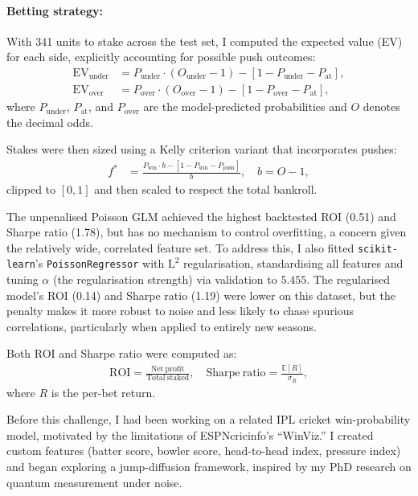\documentclass[12pt]{article}
\begin{document}
\paragraph{Betting strategy:}  
With 341 units to stake across the test set, I computed the expected value (EV) for each side, explicitly accounting for possible push outcomes:
\begin{align*}
\mathrm{EV}_\text{under} &= P_\text{under} \cdot (O_\text{under} - 1) - \left[1 - P_\text{under} - P_\text{at}\right], \\
\mathrm{EV}_\text{over}  &= P_\text{over} \cdot (O_\text{over} - 1) - \left[1 - P_\text{over} - P_\text{at}\right],
\end{align*}
where $P_\text{under}$, $P_\text{at}$, and $P_\text{over}$ are the model-predicted probabilities and $O$ denotes the decimal odds.

Stakes were then sized using a Kelly criterion variant that incorporates pushes:
\begin{align*}
f^* &= \frac{P_\text{win} \cdot b - \left[1 - P_\text{win} - P_\text{push}\right]}{b},
\quad b = O - 1,
\end{align*}
clipped to $[0,1]$ and then scaled to respect the total bankroll.

The unpenalised Poisson GLM achieved the highest backtested ROI (0.51) and Sharpe ratio (1.78), but has no mechanism to control overfitting, a concern given the relatively wide, correlated feature set.
To address this, I also fitted \texttt{scikit-learn}’s \texttt{PoissonRegressor} with $\mathrm{L}^2$ regularisation, standardising all features and tuning $\alpha$ (the regularisation strength) via validation to $5.455$.
The regularised model’s ROI (0.14) and Sharpe ratio (1.19) were lower on this dataset, but the penalty makes it more robust to noise and less likely to chase spurious correlations, particularly when applied to entirely new seasons.

Both ROI and Sharpe ratio were computed as:
\begin{eqnarray}
\mathrm{ROI} = \frac{\mathrm{Net\ profit}}{\mathrm{Total\ staked}},
\quad
\mathrm{Sharpe\ ratio} = \frac{\mathbb{E}[R]}{\sigma_R},
\end{eqnarray}
where $R$ is the per-bet return.



Before this challenge, I had been working on a related IPL cricket win-probability model, motivated by the limitations of ESPNcricinfo’s “WinViz.” I created custom features (batter score, bowler score, head-to-head index, pressure index) and began exploring a jump-diffusion framework, inspired by my PhD research on quantum measurement under noise.
\end{document}
